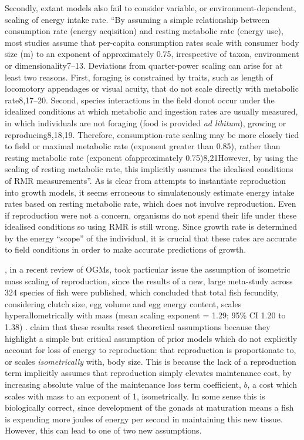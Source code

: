 \documentclass[a4paper]{article} %
\begin{document}
        Secondly, extant models also fail to consider variable, or environment-dependent, scaling of energy intake rate. ``By assuming a simple relationship between consumption rate (energy acqisition) and resting metabolic rate (energy use), most studies assume that per-capita consumption rates scale with consumer body size (m) to an exponent of approximately 0.75, irrespective of taxon, environment or dimensionality7–13. Deviations from quarter-power scaling can arise for at least two reasons. First, foraging is constrained by traits, such as length of locomotory appendages or visual acuity, that do not scale directly with metabolic rate8,17–20. Second, species interactions in the field donot occur under the idealized conditions at which metabolic and ingestion rates are usually measured, in which individuals are not foraging (food is provided \textit{ad libitum}), growing or reproducing8,18,19. Therefore, consumption-rate scaling may be more closely tied to field or maximal metabolic rate (exponent greater than 0.85), rather than resting metabolic rate (exponent ofapproximately 0.75)8,21However, by using the scaling of resting metabolic rate, this implicitly assumes the idealised conditions of RMR measurements''. As is clear from attempts to instantiate reproduction into growth models, it seems erroneous to simulatenously estimate energy intake rates based on resting metabolic rate, which does not involve reproduction. Even if reproduction were not a concern, organisms do not spend their life under these idealised conditions so using RMR is still wrong. Since growth rate is determined by the energy ``scope'' of the individual, it is crucial that these rates are accurate to field conditions in order to make accurate predictions of growth.

        \cite{Marshall2019b}, in a recent review of OGMs, took particular issue the assumption of isometric mass scaling of reproduction, since the results of a new, large meta-study across 324 species of fish were published, which concluded that total fish fecundity, considering clutch size, egg volume and egg energy content, scales hyperallometrically with mass (mean scaling exponent = 1.29; 95\% CI 1.20 to 1.38) \autocite{Barneche2018d}. \cite{Marshall2019b} claim that these results reset theoretical assumptions because they highlight a simple but critical assumption of prior models which do not explicitly account for loss of energy to reproduction: that reproduction is proportionate to, or scales \textit{isometrically} with, body size. This is because the lack of a reproduction term implicitly assumes that reproduction simply elevates maintenance cost, by increasing absolute value of the maintenance loss term coefficient, $b$, a cost which scales with mass to an exponent of 1, isometrically. In some sense this is biologically correct, since development of the gonads at maturation means a fish is expending more joules of energy per second in maintaining this new tissue. However, this can lead to one of two new assumptions. 
        
\end{document}
